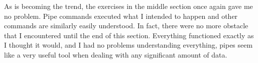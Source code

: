 \documentclass{article}
\begin{document}
As is becoming the trend, the exercises in the middle section once again gave me no problem. Pipe commands executed what I intended to happen and other commands are similarly easily understood. In fact, there were no more obstacle that I encountered until the end of this section. Everything functioned exactly as I thought it would, and I had no problems understanding everything, pipes seem like a very useful tool when dealing with any significant amount of data.
\end{document}
